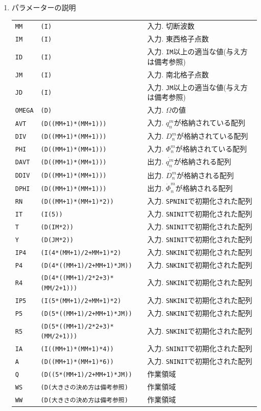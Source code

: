 \documentclass[a4j,fleqn]{jarticle}
\begin{document}
\begin{enumerate}
\item パラメーターの説明

\begin{tabular}{lll}
{\tt MM} & {\tt (I)} & 入力. 切断波数\\
{\tt IM} & {\tt (I)} & 入力. 東西格子点数\\
{\tt ID} & {\tt (I)} & 入力. {\tt IM}以上の適当な値(与え方は備考参照)\\
{\tt JM} & {\tt (I)} & 入力. 南北格子点数\\
{\tt JD} & {\tt (I)} & 入力. {\tt JM}以上の適当な値(与え方は備考参照)\\
{\tt OMEGA} & {\tt (D)} 
& 入力. $\Omega$の値\\
{\tt AVT} & {\tt (D((MM+1)*(MM+1)))} 
& 入力. $q^m_n$が格納されている配列\\
{\tt DIV} & {\tt (D((MM+1)*(MM+1)))} 
& 入力. $D^m_n$が格納されている配列\\
{\tt PHI} & {\tt (D((MM+1)*(MM+1)))} 
& 入力. $\Phi^m_n$が格納されている配列\\
{\tt DAVT} & {\tt (D((MM+1)*(MM+1)))} 
& 出力. $\dot{q^m_n}$が格納される配列\\
{\tt DDIV} & {\tt (D((MM+1)*(MM+1)))} 
& 出力. $\dot{D^m_n}$が格納される配列\\
{\tt DPHI} & {\tt (D((MM+1)*(MM+1)))} 
& 出力. $\dot{\Phi}^m_n$が格納される配列\\
{\tt RN} & {\tt (D((MM+1)*(MM+1)*2))} 
& 入力. {\tt SPNINI}で初期化された配列\\
{\tt IT}  & {\tt (I(5))}    & 入力. {\tt SNINIT}で初期化された配列\\
{\tt T}   & {\tt (D(IM*2))} & 入力. {\tt SNINIT}で初期化された配列\\
{\tt Y}   & {\tt (D(JM*2))} & 入力. {\tt SNINIT}で初期化された配列\\
{\tt IP4}  & {\tt (I(4*(MM+1)/2+MM+1)*2)} 
             & 入力. {\tt SNKINI}で初期化された配列\\
{\tt P4}  & {\tt (D(4*((MM+1)/2+MM+1)*JM))} 
             & 入力. {\tt SNKINI}で初期化された配列\\
{\tt R4}  & {\tt (D(4*((MM+1)/2*2+3)*(MM/2+1)))}
             & 入力. {\tt SNKINI}で初期化された配列\\
{\tt IP5}  & {\tt (I(5*(MM+1)/2+MM+1)*2)} 
             & 入力. {\tt SNKINI}で初期化された配列\\
{\tt P5}  & {\tt (D(5*((MM+1)/2+MM+1)*JM))} 
             & 入力. {\tt SNKINI}で初期化された配列\\
{\tt R5}  & {\tt (D(5*((MM+1)/2*2+3)*(MM/2+1)))} 
             & 入力. {\tt SNKINI}で初期化された配列\\
{\tt IA}  & {\tt (I((MM+1)*(MM+1)*4))} 
             & 入力. {\tt SNINIT}で初期化された配列\\
{\tt A}  & {\tt (D((MM+1)*(MM+1)*6))}
             & 入力. {\tt SNINIT}で初期化された配列\\
{\tt Q}  & {\tt (D((5*(MM+1)/2+MM+1)*JM))} 
             & 作業領域\\
{\tt WS}  & {\tt (D(大きさの決め方は備考参照)} & 作業領域\\
{\tt WW}  & {\tt (D(大きさの決め方は備考参照)} & 作業領域
\end{tabular}


\end{enumerate}
\end{document}
